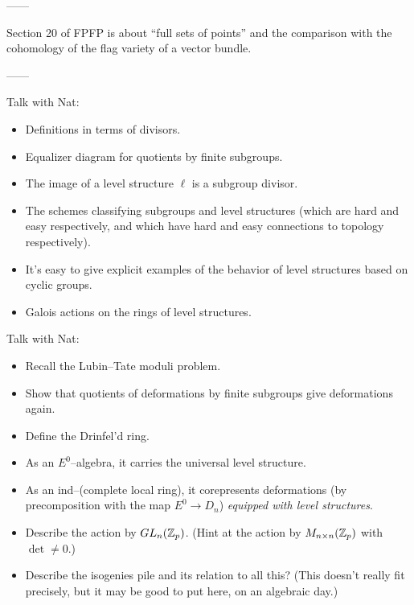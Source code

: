 ------

Section 20 of FPFP is about ``full sets of points'' and the comparison with the cohomology of the flag variety of a vector bundle.

------

Talk with Nat:
\begin{itemize}
\item Definitions in terms of divisors.
\item Equalizer diagram for quotients by finite subgroups.
\item The image of a level structure $\ell$ is a subgroup divisor.
\item The schemes classifying subgroups and level structures (which are hard and easy respectively, and which have hard and easy connections to topology respectively).
\item It's easy to give explicit examples of the behavior of level structures based on cyclic groups.
\item Galois actions on the rings of level structures.
\end{itemize}





Talk with Nat:
\begin{itemize}
\item Recall the Lubin--Tate moduli problem.
\item Show that quotients of deformations by finite subgroups give deformations again.
\item Define the Drinfel'd ring.
\item As an $E^0$--algebra, it carries the universal level structure.
\item As an ind--(complete local ring), it corepresents deformations (by precomposition with the map $E^0 \to D_n$) \emph{equipped with level structures}.
\item Describe the action by $GL_n(\mathbb Z_p)$. (Hint at the action by $M_{n \times n}(\mathbb Z_p)$ with $\det \ne 0$.)
\item Describe the isogenies pile and its relation to all this?  (This doesn't really fit precisely, but it may be good to put here, on an algebraic day.)
\end{itemize}











